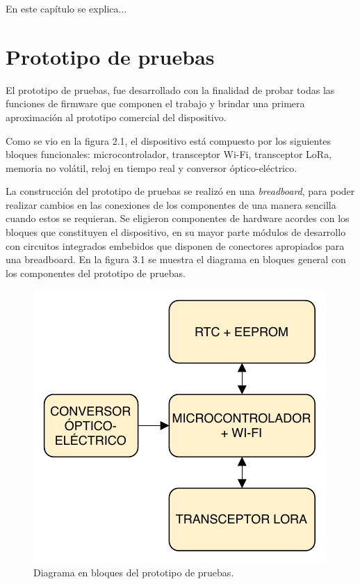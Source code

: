 
En este capítulo se explica...


\section{Prototipo de pruebas}

El prototipo de pruebas, fue desarrollado con la finalidad de probar todas las funciones de firmware que componen el trabajo y brindar una primera aproximación al prototipo comercial del dispositivo.

Como se vio en la figura 2.1, el dispositivo está compuesto por los siguientes bloques funcionales: microcontrolador, transceptor Wi-Fi, transceptor LoRa, memoria no volátil, reloj en tiempo real y conversor óptico-eléctrico.

La construcción del prototipo de pruebas se realizó en una \textit{breadboard}, para poder realizar cambios en las conexiones de los componentes de una manera sencilla cuando estos se requieran. Se eligieron componentes de hardware acordes con los bloques que constituyen el dispositivo, en su mayor parte módulos de desarrollo con circuitos integrados embebidos que disponen de conectores apropiados para una breadboard. En la figura 3.1 se muestra el diagrama en bloques general con los componentes del prototipo de pruebas.


\begin{figure}[h]
	\centering
	\includegraphics[scale=1]{./Figures/test_blocks.pdf}
	\caption{Diagrama en bloques del prototipo de pruebas.}
	\label{fig:blocksTest}
\end{figure}

